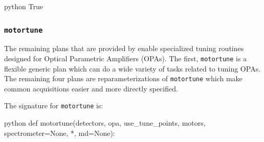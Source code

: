 \begin{codefragment}{python}
True
\end{codefragment}


\subsubsection{\texttt{motortune}}

The remaining plans that are provided by \wrightplans enable specialized tuning routines designed for Optical Parametric Amplifiers (OPAs).
The first, \texttt{motortune} is a flexible generic plan which can do a wide variety of tasks related to tuning OPAs.
The remaining four plans are reparameterizations of \texttt{motortune} which make common acquisitions easier and more directly specified.

The signature for \texttt{motortune} is:

\begin{codefragment}{python}
def motortune(detectors, opa, use_tune_points, motors, spectrometer=None, *, md=None):
\end{codefragment}

